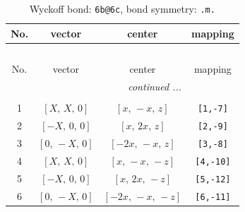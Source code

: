 \documentclass[fleqn,8pt]{jsarticle}
\begin{document}
\begin{longtable}{cccc}
\caption{Wyckoff bond: {\tt 6b@6c}, bond symmetry: {\tt .m.}}
 \\
 \hline \hline
No. & vector & center & mapping \\ \hline \endfirsthead

\multicolumn{3}{l}{\tablename\ \thetable{}} \\
 \hline \hline
No. & vector & center & mapping \\ \hline \endhead

 \hline \hline
\multicolumn{3}{r}{\footnotesize\it continued ...} \\ \endfoot

 \hline \hline
\multicolumn{3}{r}{} \\ \endlastfoot

1 & $\left[ X,\, X,\, 0 \right]$ & $\left[ x,\, - x,\, z \right]$ & {\tt [1,-7]} \\ \hline
2 & $\left[ - X,\, 0,\, 0 \right]$ & $\left[ x,\, 2 x,\, z \right]$ & {\tt [2,-9]} \\ \hline
3 & $\left[ 0,\, - X,\, 0 \right]$ & $\left[ - 2 x,\, - x,\, z \right]$ & {\tt [3,-8]} \\ \hline
4 & $\left[ X,\, X,\, 0 \right]$ & $\left[ x,\, - x,\, - z \right]$ & {\tt [4,-10]} \\ \hline
5 & $\left[ - X,\, 0,\, 0 \right]$ & $\left[ x,\, 2 x,\, - z \right]$ & {\tt [5,-12]} \\ \hline
6 & $\left[ 0,\, - X,\, 0 \right]$ & $\left[ - 2 x,\, - x,\, - z \right]$ & {\tt [6,-11]} \\
\end{longtable}
\renewcommand{\arraystretch}{1.2}
\end{document}
